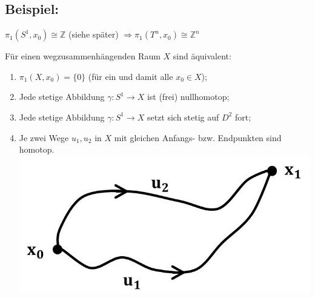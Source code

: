 \documentclass[a4paper,11pt,notitlepage]{report}
\theoremstyle{definition}
\newcommand{\Z}{{\ensuremath{\mathbb{Z}}}}
\newenvironment{bsp}[1]
{
\setlength{\fboxsep}{10pt}
\subsection*{Beispiel: #1}
\begin{upshape}
}
{
\end{upshape}
}
\begin{document}
\begin{bsp}{}
	$\pi_1(S^1,x_0) \cong \Z$ (siehe später) \newline
	$\Rightarrow \pi_1(T^n, x_0) \cong \Z^n$
\end{bsp}

\begin{theorem}
	Für einen wegzusammenhängenden Raum $X$ sind äquivalent:
	\begin{enumerate}
		\item $\pi_1(X,x_0) = \{0\}$ (für ein und damit alle $x_0 \in X$);
		\item Jede stetige Abbildung $\gamma \colon S^1 \rightarrow X$ ist (frei) nullhomotop;
		\item Jede stetige Abbildung $\gamma \colon S^1 \rightarrow X$ setzt sich stetig auf $D^2$ fort; %
		\item Je zwei Wege $u_1, u_2$ in $X$ mit gleichen Anfangs- bzw. Endpunkten sind homotop. \newline
		\includegraphics[scale=0.4]{images/Wege_homotop.jpg}
	\end{enumerate}
\end{theorem}
\end{document}
